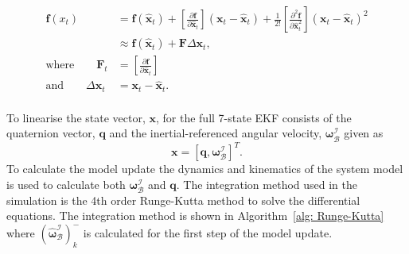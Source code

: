 \begin{equation}
\begin{aligned}
\mathbf{f}(x_t) &= \mathbf{f}(\hat{\mathbf{x}}_t) + \left[\frac{\partial \mathbf{f}}{\partial \hat{\mathbf{x}}_t} \right] \left(\mathbf{x}_t - \hat{\mathbf{x}}_t \right) + \frac{1}{2!} \left[\frac{\partial^2 \mathbf{f}}{\partial \hat{\mathbf{x}}_t^2} \right] \left(\mathbf{x}_t - \hat{\mathbf{x}}_t \right)^2 \\
&\approx \mathbf{f} (\hat{\mathbf{x}}_t) + \mathbf{F} \Delta \mathbf{x}_t , \\
\text{where} \qquad \mathbf{F}_t &= \left[\frac{\partial \mathbf{f}}{\partial \hat{\mathbf{x}}_t} \right] \\
\text{and} \qquad \Delta \mathbf{x}_t &= \mathbf{x}_t - \hat{\mathbf{x}}_t. \\
\end{aligned}
\end{equation}


To linearise the state vector, $\mathbf{x}$, for the full 7-state EKF consists of the quaternion vector, $\mathbf{q}$ and the inertial-referenced angular velocity, $\boldsymbol{\omega}_{\mathcal{B}}^{\mathcal{I}}$ given as
\begin{equation}
\mathbf{x} = [\mathbf{q}, \boldsymbol{\omega}_{\mathcal{B}}^{\mathcal{I}}]^T.
\end{equation}
To calculate the model update the dynamics and kinematics of the system model is used to calculate both $\boldsymbol{\omega}_{\mathcal{B}}^{\mathcal{I}}$ and $\mathbf{q}$. The integration method used in the simulation is the 4th order Runge-Kutta method to solve the differential equations. The integration method is shown in Algorithm~\ref{alg: Runge-Kutta} where $(\boldsymbol{\hat{\omega}}_{\mathcal{B}}^{\mathcal{I}})_k^-$ is calculated for the first step of the model update.


